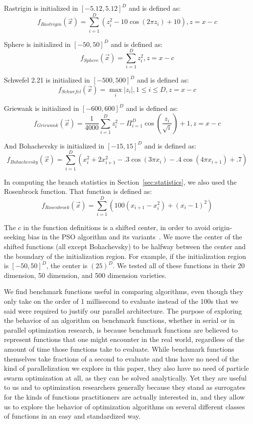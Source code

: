 \documentclass[smallcondensed]{svjour3}
\renewcommand{\sec}[1]{Section~\ref{sec:#1}}
\begin{document}
Rastrigin is initialized in $[-5.12,5.12]^D$ and is defined as:
\[f_{Rastrigin}(\Vec{x}) = \sum_{i=1}^D\left(z_i^2 - 10\cos\left(2\pi
z_i\right) + 10\right), z=x-c\]

Sphere is initialized in $[-50,50]^D$ and is defined as:
\[f_{Sphere}(\Vec{x}) = \sum_{i=1}^D z_i^2, z=x-c\]

Schwefel 2.21 is initialized in $[-500,500]^D$ and is defined as:
\[f_{Schwefel}(\Vec{x}) = \max_i{|z_i|, 1 \leq i \leq D}, z=x-c\]

Griewank is initialized in $[-600,600]^D$ and is defined as:
\[f_{Griewank}(\Vec{x}) = \frac{1}{4000}\sum_{i=1}^D z_i^2 - \Pi_{i=1}^D
\cos\left(\frac{z_i}{\sqrt{i}} \right) + 1, z=x-c\]

And Bohachevsky is initialized in $[-15,15]^D$ and is defined as:
\[f_{Bohachevsky}(\Vec{x}) = \sum_{i=1}^D(x_i^2+2x_{i+1}^2-.3\cos(3\pi
x_i)-.4\cos(4\pi x_{i+1})+.7)\]

In computing the branch statistics in \sec{statistics}, we also used the
Rosenbrock function.  That function is defined as:
\[f_{Rosenbrock}(\Vec{x}) = \sum_{i=1}^D
\left(100(x_{i+1}-x_i^2)+(x_i-1)^2\right)\]

The $c$ in the function definitions is a shifted center, in order to avoid
origin-seeking bias in the PSO algorithm and its
variants~\citep{monson-2005-origin-seeking-bias}.  We move the center of the
shifted functions (all except Bohachevsky) to be halfway between the center and
the boundary of the initialization region.  For example, if the initialization
region is $[-50,50]^D$, the center is $(25)^D$.  We tested all of these
functions in their 20 dimension, 50 dimension, and 500 dimension varieties.

We find benchmark functions useful in comparing algorithms, even though they
only take on the order of 1 millisecond to evaluate instead of the 100s that we
said were required to justify our parallel architecture.  The purpose of
exploring the behavior of an algorithm on benchmark functions, whether in
serial or in parallel optimization research, is because benchmark functions are
believed to represent functions that one might encounter in the real world,
regardless of the amount of time those functions take to evaluate.  While
benchmark functions themselves take fractions of a second to evaluate and thus
have no need of the kind of parallelization we explore in this paper, they also
have no need of particle swarm optimization at all, as they can be solved
analytically.  Yet they are useful to us and to optimization researchers
generally because they stand as surrogates for the kinds of functions
practitioners are actually interested in, and they allow us to explore the
behavior of optimization algorithms on several different classes of functions
in an easy and standardized way.
\end{document}
